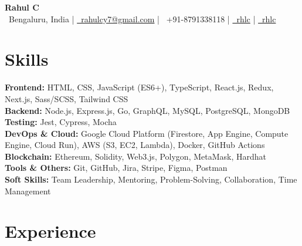 \documentclass[10pt, letterpaper]{article}
\newenvironment{onecolentry}{
    \begin{adjustwidth}{0.2 cm}{0.2 cm}
}{
    \end{adjustwidth}
}
\begin{document}
\begin{center}
    {\fontsize{20pt}{20pt}\selectfont \textbf{Rahul C}}\\
    \vspace{0.15cm}
    {\faMapMarker*~Bengaluru, India \quad|\quad
     \href{mailto:rahulcy7@gmail.com}{\faEnvelope[regular]~rahulcy7@gmail.com} \quad|\quad
     \faPhone*~+91-8791338118 \quad|\quad
     \href{https://linkedin.com/in/rhlc}{\faLinkedinIn~rhlc} \quad|\quad
     \href{https://github.com/rhlc}{\faGithub~rhlc}}
\end{center}

\section{Skills}
\begin{onecolentry}
\textbf{Frontend:} HTML, CSS, JavaScript (ES6+), TypeScript, React.js, Redux, Next.js, Sass/SCSS, Tailwind CSS \\
\textbf{Backend:} Node.js, Express.js, Go, GraphQL, MySQL, PostgreSQL, MongoDB \\
\textbf{Testing:} Jest, Cypress, Mocha \\
\textbf{DevOps \& Cloud:} Google Cloud Platform (Firestore, App Engine, Compute Engine, Cloud Run), AWS (S3, EC2, Lambda), Docker, GitHub Actions \\
\textbf{Blockchain:} Ethereum, Solidity, Web3.js, Polygon, MetaMask, Hardhat \\
\textbf{Tools \& Others:} Git, GitHub, Jira, Stripe, Figma, Postman \\
\textbf{Soft Skills:} Team Leadership, Mentoring, Problem-Solving, Collaboration, Time Management
\end{onecolentry}

\section{Experience}
\end{document}
